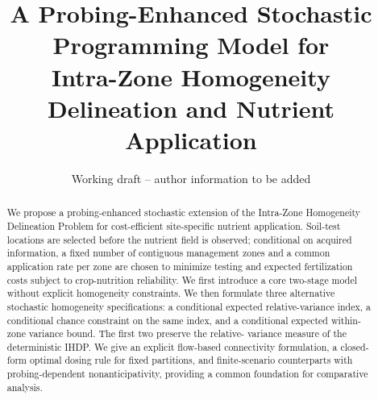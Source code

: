 \documentclass[11pt,a4paper]{article}
\title{A Probing-Enhanced Stochastic Programming Model for\\
Intra-Zone Homogeneity Delineation and Nutrient Application}
\author{Working draft -- author information to be added}
\date{}
\numberwithin{equation}{section}
\begin{document}
\maketitle

\begin{abstract}
We propose a probing-enhanced stochastic extension of the Intra-Zone
Homogeneity Delineation Problem for cost-efficient site-specific nutrient
application. Soil-test locations are selected before the nutrient field is
observed; conditional on acquired information, a fixed number of contiguous
management zones and a common application rate per zone are chosen to
minimize testing and expected fertilization costs subject to crop-nutrition
reliability. We first introduce a core two-stage model without explicit
homogeneity constraints. We then formulate three alternative stochastic
homogeneity specifications: a conditional expected relative-variance index,
a conditional chance constraint on the same index, and a conditional
expected within-zone variance bound. The first two preserve the relative-
variance measure of the deterministic IHDP. We give an explicit flow-based
connectivity formulation, a closed-form optimal dosing rule for fixed
partitions, and finite-scenario counterparts with probing-dependent
nonanticipativity, providing a common foundation for comparative analysis.
\end{abstract}





\end{document}
